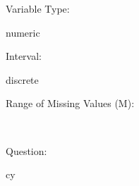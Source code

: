 \documentclass[
]{article}
\begin{document}
\begin{minipage}[t]{0.3\linewidth}

Variable Type:

\end{minipage}%
\begin{minipage}[t]{0.7\linewidth}

numeric

\end{minipage}

\begin{minipage}[t]{0.3\linewidth}

Interval:

\end{minipage}%
\begin{minipage}[t]{0.7\linewidth}

discrete

\end{minipage}

\begin{minipage}[t]{0.3\linewidth}

Range of Missing Values (M):

\end{minipage}%
\begin{minipage}[t]{0.7\linewidth}

~

\end{minipage}

\begin{minipage}[t]{0.3\linewidth}

Question:

\end{minipage}%
\begin{minipage}[t]{0.7\linewidth}

cy

\end{minipage}
\end{document}
